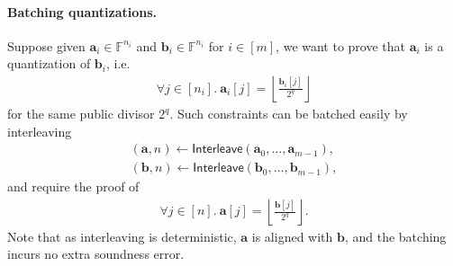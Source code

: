 \paragraph{Batching quantizations.}
Suppose given $\mathbf{a}_i\in \mathbb{F}^{n_i}$ and $\mathbf{b}_i\in \mathbb{F}^{n_i}$ for $i\in [m]$,
we want to prove that $\mathbf{a}_i$ is a quantization of $\mathbf{b}_i$, i.e.
\begin{align}
  \forall j\in [n_i].\ \mathbf{a}_i[j] = \left\lfloor \frac{\mathbf{b}_i[j]}{2^q} \right\rfloor
\end{align}
for the same public divisor $2^q$.
Such constraints can be batched easily by interleaving
\begin{align}
  (\mathbf{a}, n) \gets \mathsf{Interleave}(\mathbf{a}_0, \dots, \mathbf{a}_{m-1}),\\
  (\mathbf{b}, n) \gets \mathsf{Interleave}(\mathbf{b}_0, \dots, \mathbf{b}_{m-1}),
\end{align}
and require the proof of
\begin{align}
  \forall j\in [n].\ \mathbf{a}[j] = \left\lfloor \frac{\mathbf{b}[j]}{2^q} \right\rfloor.
\end{align}
Note that as interleaving is deterministic,
 $\mathbf{a}$ is aligned with $\mathbf{b}$, 
 and the batching incurs no extra soundness error.
